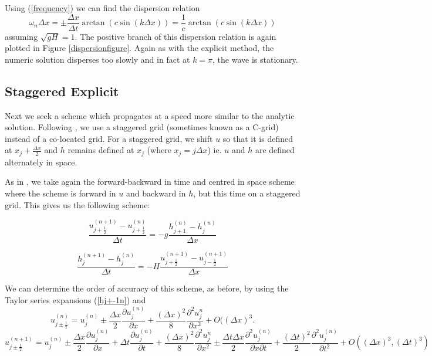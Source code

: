\documentclass[a4paper,12pt, notitlepage]{article}
\begin{document}
Using (\ref{frequency}) we can find the dispersion relation
\begin{equation}
\omega_{n} \Delta x = \pm\frac{\Delta x}{\Delta t} \arctan(c\sin(k\Delta x)) = \frac{1}{c}  \arctan(c\sin(k\Delta x))
\end{equation}
assuming $\sqrt{gH} = 1$. The positive branch of this dispersion relation is again plotted in Figure \ref{dispersionfigure}. Again as with the explicit method, the numeric solution disperses too slowly and in fact at $k = \pi$, the wave is stationary. 

\subsection{Staggered Explicit}
Next we seek a scheme which propagates at a speed more similar to the analytic solution. Following \cite{MPE textbook}, we use a staggered grid (sometimes known as a C-grid) instead of a co-located grid. For a staggered grid, we shift $u$ so that it is defined at $x_{j} + \frac{\Delta x}{2}$ and $h$ remains defined at $x_{j}$ (where $x_{j} = j \Delta x$) ie. $u$ and $h$ are defined alternately in space.

As in \cite{MPE textbook}, we take again the forward-backward in time and centred in space scheme where the scheme is forward in $u$ and backward in $h$, but this time on a staggered grid. This gives us the following scheme:

\begin{equation}\label{FTCSCgrid}
\frac{u_{j+ \frac{1}{2}}^{(n+1)} - u_{j + \frac{1}{2}}^{(n)}}{\Delta t} = -g \frac{h_{j+1}^{(n)} - h_{j}^{(n)}}{\Delta x}
\end{equation}

\begin{equation}\label{BTCSCgrid}
\frac{h_{j}^{(n+1)} - h_{j}^{(n)}}{\Delta t} = -H \frac{u_{j+\frac{1}{2}}^{(n+1)} - u_{j-\frac{1}{2}}^{(n+1)}}{\Delta x}
\end{equation}


We can determine the order of accuracy of this scheme, as before, by using the Taylor series expansions (\ref{hj+-1n}) and 
\begin{equation} \label{uj+1/2n}
u_{j \pm \frac{1}{2}}^{(n)} = u_{j}^{(n)} \pm \frac{\Delta x}{2}\frac{\partial u_{j}^{(n)}}{\partial x} + \frac{(\Delta x)^{2}}{8}\frac{\partial^{2}u_{j}^{n}}{\partial x^{2}} + O({(\Delta x)^{3}}.
\end{equation}
\begin{equation} \label{uj+1/2n+1}
u_{j \pm \frac{1}{2}}^{(n + 1)} = u_{j}^{(n)} \pm \frac{\Delta x}{2}\frac{\partial u_{j}^{(n)}}{\partial x} + \Delta t \frac{\partial u_{j}^{(n)}}{\partial t} + \frac{(\Delta x)^{2}}{8}\frac{\partial^{2}u_{j}^{n}}{\partial x^{2}} \pm \frac{\Delta t \Delta x}{2}\frac{\partial^{2} u_{j}^{(n)}}{\partial x \partial t} + \frac{(\Delta t)^{2}}{2} \frac{\partial ^{2} u_{j}^{(n)}}{\partial t ^{2}} + O((\Delta x)^{3}, (\Delta t)^{3})
\end{equation}
\end{document}
